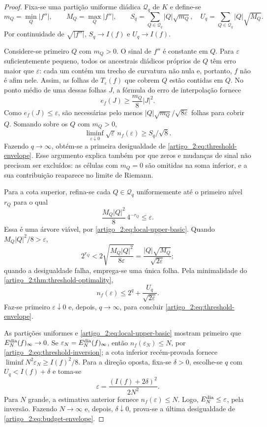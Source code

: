 \documentclass[12pt,a4paper]{article}
\theoremstyle{preciso}
\theoremstyle{definition}
\theoremstyle{preciso}
\theoremstyle{preciso}
\theoremstyle{preciso}
\theoremstyle{preciso}
\theoremstyle{definition}
\theoremstyle{preciso}
\theoremstyle{definition}
\theoremstyle{preciso}
\theoremstyle{preciso}
\theoremstyle{definition}
\begin{document}
\begin{proof}
Fixa-se uma partição uniforme diádica $\mathcal Q_q$ de $K$ e define-se
\[
 m_Q=\min_Q|f''|,
 \qquad M_Q=\max_Q|f''|,
 \qquad
 S_q=\sum_{Q\in\mathcal Q_q}|Q|\sqrt{m_Q},
 \quad U_q=\sum_{Q\in\mathcal Q_q}|Q|\sqrt{M_Q}.
\]
Por continuidade de $\sqrt{|f''|}$, $S_q\to I(f)$ e $U_q\to I(f)$.

Considere-se primeiro $Q$ com $m_Q>0$. O sinal de $f''$ é constante em $Q$.
Para $\varepsilon$ suficientemente pequeno, todos os ancestrais diádicos
próprios de $Q$ têm erro maior que $\varepsilon$: cada um contém um trecho
de curvatura não nula e, portanto, $f$ não é afim nele. Assim, as folhas de
$T_\varepsilon(f)$ que cobrem $Q$ estão contidas em $Q$. No ponto médio de
uma dessas folhas $J$, a fórmula do erro de interpolação fornece
\[
 e_f(J)\ge \frac{m_Q}{8}|J|^2.
\]
Como $e_f(J)\le\varepsilon$, são necessárias pelo menos
$|Q|\sqrt{m_Q}/\sqrt{8\varepsilon}$ folhas para cobrir $Q$. Somando sobre os
$Q$ com $m_Q>0$,
\[
 \liminf_{\varepsilon\downarrow0}
 \sqrt\varepsilon\,n_f(\varepsilon)\ge S_q/\sqrt8.
\]
Fazendo $q\to\infty$, obtém-se a primeira desigualdade de
\eqref{artigo_2:eq:threshold-envelope}. Esse argumento explica também por que zeros e
mudanças de sinal não precisam ser excluídos: as células com $m_Q=0$ são
omitidas na soma inferior, e a sua contribuição reaparece no limite de Riemann.

Para a cota superior, refina-se cada $Q\in\mathcal Q_q$ uniformemente até o
primeiro nível $r_Q$ para o qual
\[
 \frac{M_Q|Q|^2}{8}\,4^{-r_Q}\le\varepsilon.
\]
Essa é uma árvore viável, por \eqref{artigo_2:eq:local-upper-basic}. Quando
$M_Q|Q|^2/8>\varepsilon$,
\[
 2^{r_Q}<2\sqrt{\frac{M_Q|Q|^2}{8\varepsilon}}
 =\frac{|Q|\sqrt{M_Q}}{\sqrt{2\varepsilon}};
\]
quando a desigualdade falha, emprega-se uma única folha. Pela minimalidade do
\cref{artigo_2:thm:threshold-optimality},
\[
 n_f(\varepsilon)
 \le 2^q+\frac{U_q}{\sqrt{2\varepsilon}}.
\]
Faz-se primeiro $\varepsilon\downarrow0$ e, depois, $q\to\infty$, para concluir
\eqref{artigo_2:eq:threshold-envelope}.

As partições uniformes e \eqref{artigo_2:eq:local-upper-basic} mostram primeiro que
$E_N^{\rm dia}(f)_\infty\to0$. Se
$\varepsilon_N=E_N^{\rm dia}(f)_\infty$, então
$n_f(\varepsilon_N)\le N$, por \eqref{artigo_2:eq:threshold-inversion}; a cota inferior
recém-provada fornece
$\liminf N^2\varepsilon_N\ge I(f)^2/8$. Para a direção oposta, fixa-se
$\delta>0$, escolhe-se $q$ com $U_q<I(f)+\delta$ e toma-se
\[
 \varepsilon=\frac{(I(f)+2\delta)^2}{2N^2}.
\]
Para $N$ grande, a estimativa anterior fornece
$n_f(\varepsilon)\le N$. Logo, $E_N^{\rm dia}\le\varepsilon$, pela inversão.
Fazendo $N\to\infty$ e, depois, $\delta\downarrow0$, prova-se a última desigualdade
de \eqref{artigo_2:eq:budget-envelope}.
\end{proof}
\end{document}
